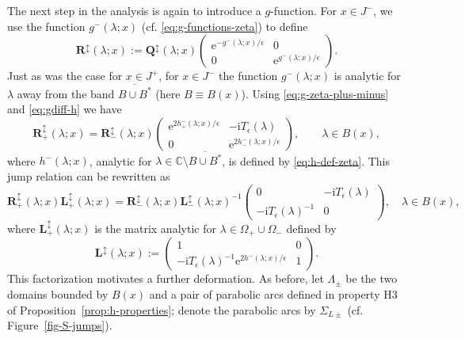\documentclass[12pt]{amsart}
\numberwithin{equation}{section}
\newcommand{\ee}{\mathrm{e}}
\newcommand{\ii}{\mathrm{i}}
\newcommand{\SP}{\lambda}
\newcommand{\C}{\mathbb{C}}
\newcommand{\eps}{\epsilon}
\begin{document}
The next step in the analysis is again to introduce a $g$-function.  For $x \in J^-$, we use the function $g^-(\SP;x)$ (cf. \eqref{eq:g-functions-zeta}) to define
\begin{equation}
\mathbf{R}^\updownarrow(\SP;x) := \mathbf{Q}^\updownarrow(\SP;x)  \begin{pmatrix} \ee^{-g^-(\SP;x)/\eps } & 0 \\ 0 &  \ee^{g^-(\SP;x)/\eps }  \end{pmatrix}.
\end{equation}
Just as was the case for $x\in J^+$, for $x \in J^-$ the function $g^-(\SP;x)$ is analytic for $\SP$ away from the band $\overline{B \cup B^*}$ (here $B\equiv B(x)$). Using \eqref{eq:g-zeta-plus-minus} and \eqref{eq:gdiff-h} we have
\begin{equation}
	\mathbf{R}_+^\updownarrow(\SP;x) = \mathbf{R}_-^\updownarrow(\SP;x) 
	\begin{pmatrix} 
		\ee^{2h^-_+(\SP;x)/ \eps} &-\ii T_\eps(\SP) \\ 0 & \ee^{2h^-_-(\SP;x)/ \eps}
	\end{pmatrix},
	\qquad \SP \in B(x),
\end{equation}
where $h^-(\SP;x)$, analytic for $\SP\in \C \setminus \overline{B \cup B^*}$, is defined by \eqref{eq:h-def-zeta}. 
This jump relation can be rewritten as
\begin{equation}
	\mathbf{R}_+^\updownarrow(\SP;x) \mathbf{L}_+^\updownarrow(\SP;x) = \mathbf{R}_-^\updownarrow(\SP;x) \mathbf{L}_-^\updownarrow(\SP;x)^{-1} 
	\begin{pmatrix} 0 & -\ii T_\eps(\SP) \\ -\ii T_\eps(\SP)^{-1} & 0 \end{pmatrix}, \quad \SP \in B(x), 
\end{equation}
where $\mathbf{L}_+^\updownarrow(\SP;x)$ is the matrix analytic for $\SP \in \Omega_+ \cup \Omega_-$ defined by 
\begin{equation}
	 \mathbf{L}^\updownarrow(\SP;x) := \begin{pmatrix} 1 & 0 \\ -\ii T_\eps(\SP)^{-1} \ee^{2h^-(\SP;x)/\eps } & 1 \end{pmatrix}.
\end{equation}
This factorization  motivates a further deformation. 
As before, let $\Lambda_\pm$ be the two domains bounded by $B(x)$ and a pair of parabolic arcs defined in property H3 of Proposition~\ref{prop:h-properties}; denote the parabolic arcs by $\Sigma_{L\pm}$ (cf. Figure~\ref{fig-S-jumps}).
\end{document}
